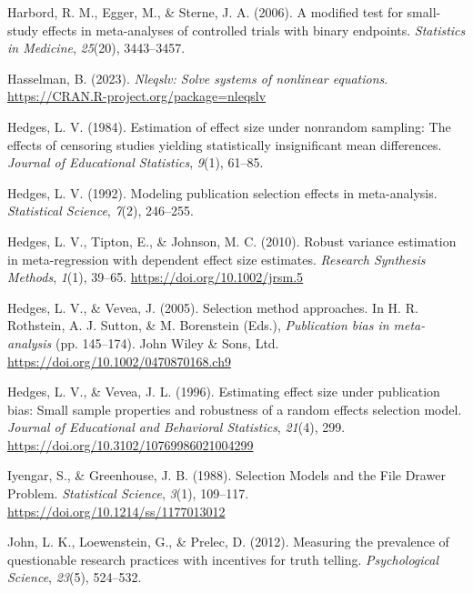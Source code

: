 \documentclass[
  man, donotrepeattitle,floatsintext]{apa7}
\newlength{\cslhangindent}
\newenvironment{CSLReferences}[2] %
 {\begin{list}{}{%
  \setlength{\itemindent}{0pt}
  \setlength{\leftmargin}{0pt}
  \setlength{\parsep}{0pt}
  \ifodd #1
   \setlength{\leftmargin}{\cslhangindent}
   \setlength{\itemindent}{-1\cslhangindent}
  \fi
  \setlength{\itemsep}{#2\baselineskip}}}
 {\end{list}}
\begin{document}
\begin{CSLReferences}{1}{0}
Harbord, R. M., Egger, M., \& Sterne, J. A. (2006). A modified test for small-study effects in meta-analyses of controlled trials with binary endpoints. \emph{Statistics in Medicine}, \emph{25}(20), 3443--3457.

Hasselman, B. (2023). \emph{Nleqslv: Solve systems of nonlinear equations}. \url{https://CRAN.R-project.org/package=nleqslv}

Hedges, L. V. (1984). Estimation of effect size under nonrandom sampling: The effects of censoring studies yielding statistically insignificant mean differences. \emph{Journal of Educational Statistics}, \emph{9}(1), 61--85.

Hedges, L. V. (1992). Modeling publication selection effects in meta-analysis. \emph{Statistical Science}, \emph{7}(2), 246--255.

Hedges, L. V., Tipton, E., \& Johnson, M. C. (2010). {Robust variance estimation in meta-regression with dependent effect size estimates}. \emph{Research Synthesis Methods}, \emph{1}(1), 39--65. \url{https://doi.org/10.1002/jrsm.5}

Hedges, L. V., \& Vevea, J. (2005). Selection method approaches. In H. R. Rothstein, A. J. Sutton, \& M. Borenstein (Eds.), \emph{Publication bias in meta-analysis} (pp. 145--174). {John Wiley \& Sons, Ltd}. \url{https://doi.org/10.1002/0470870168.ch9}

Hedges, L. V., \& Vevea, J. L. (1996). {Estimating effect size under publication bias: Small sample properties and robustness of a random effects selection model}. \emph{Journal of Educational and Behavioral Statistics}, \emph{21}(4), 299. \url{https://doi.org/10.3102/10769986021004299}

Iyengar, S., \& Greenhouse, J. B. (1988). Selection {Models} and the {File} {Drawer} {Problem}. \emph{Statistical Science}, \emph{3}(1), 109--117. \url{https://doi.org/10.1214/ss/1177013012}

John, L. K., Loewenstein, G., \& Prelec, D. (2012). Measuring the prevalence of questionable research practices with incentives for truth telling. \emph{Psychological Science}, \emph{23}(5), 524--532.


\end{CSLReferences}
\end{document}
